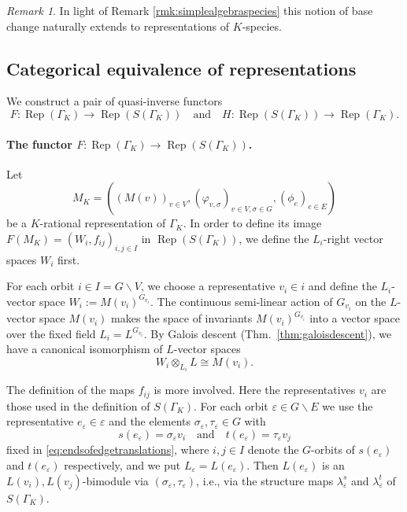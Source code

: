 \documentclass[a4paper,12pt,reqno]{amsart}
\DeclareMathOperator{\Rep}{\mathrm{Rep}}
\theoremstyle{plain}
\theoremstyle{remark}
\newtheorem{remark}[theorem]{Remark}
\begin{document}
  \begin{remark}\label{rmk:repbasechangegeneral}
    In light of Remark \ref{rmk:simplealgebraspecies} this notion of base change naturally extends to representations of $K$-species.
  \end{remark}

  \subsection{Categorical equivalence of representations}
  
  We construct a pair of quasi-inverse functors
  \[
  F \colon \Rep(\Gamma_K) \to \Rep(S(\Gamma_K))\quad\text{and}\quad H \colon \Rep(S(\Gamma_K)) \to \Rep(\Gamma_K).
  \]

  \paragraph{The functor $F \colon \Rep(\Gamma_K) \to \Rep(S(\Gamma_K))$.}
  Let
  \[
  M_K = ((M(v))_{v\in V}, (\varphi_{v,\sigma})_{v\in V,\sigma\in G}, (\phi_e)_{e\in E})
  \]
  be a $K$-rational representation of $\Gamma_K$. In order to define its image $F(M_K) = (W_i, f_{ij})_{i,j\in I}$ in $\Rep(S(\Gamma_K))$, we define the $L_i$-right vector spaces $W_i$ first. 

  \smallskip
  For each orbit $i \in I = G\backslash V$, we choose a representative $v_i \in i$ and define the $L_i$-vector space $W_i := M(v_i)^{G_{v_i}}$. The continuous semi-linear action of $G_{v_i}$ on the $L$-vector space $M(v_i)$ makes the space of invariants $M(v_i)^{G_{v_i}}$ into a vector space over the fixed field $L_i = L^{G_{v_i}}$. By Galois descent (Thm.~\ref{thm:galoisdescent}), we have a canonical isomorphism of $L$-vector spaces
    \begin{equation}
      W_i\otimes_{L_i} L\cong M(v_i).
      \label{eq:WitoMvi}
    \end{equation}

    \smallskip
    The definition of the maps $f_{ij}$ is more involved. Here the representatives $v_i$ are those used in the definition of $S(\Gamma_K)$. For each orbit $\varepsilon\in G\backslash E$ we use the representative $e_\varepsilon \in \varepsilon$ and the elements $\sigma_\varepsilon,\tau_\varepsilon\in G$ with
    \[
      s(e_\varepsilon)=\sigma_\varepsilon v_i\quad\text{and}\quad
      t(e_\varepsilon)=\tau_\varepsilon v_j
    \]
    fixed in \eqref{eq:endsofedgetranslations}, where $i,j\in I$ denote the $G$-orbits of $s(e_\varepsilon)$ and $t(e_\varepsilon)$ respectively, and we put $L_\varepsilon=L(e_\varepsilon)$. Then $L(e_\varepsilon)$ is an $L(v_i),L(v_j)$-bimodule via $(\sigma_\varepsilon,\tau_\varepsilon)$, i.e., via the structure maps $\lambda^s_\varepsilon$ and $\lambda^t_\varepsilon$ of $S(\Gamma_K)$.
\end{document}
